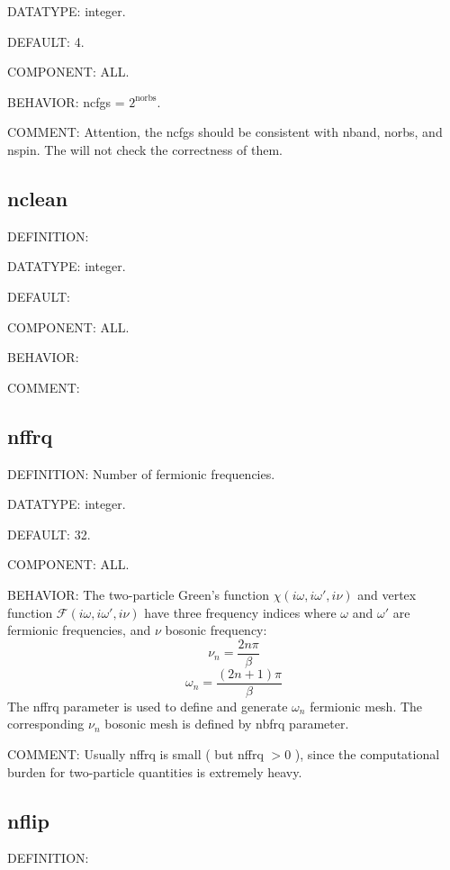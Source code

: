 {\color{green}DATATYPE:} integer.

{\color{blue}DEFAULT:} 4.

{\color{brown}COMPONENT:} ALL.

{\color{purple}BEHAVIOR:} ncfgs = $2^{\text{norbs}}$.

{\color{olive}COMMENT:} Attention, the ncfgs should be consistent with nband, norbs, and nspin. The {\iqist} will not check the 
correctness of them.

\subsection{nclean}
{\color{red}DEFINITION:}

{\color{green}DATATYPE:} integer.

{\color{blue}DEFAULT:}

{\color{brown}COMPONENT:} ALL.

{\color{purple}BEHAVIOR:}

{\color{olive}COMMENT:}

\subsection{nffrq}
{\color{red}DEFINITION:} Number of fermionic frequencies.

{\color{green}DATATYPE:} integer.

{\color{blue}DEFAULT:} 32.

{\color{brown}COMPONENT:} ALL.

{\color{purple}BEHAVIOR:} The two-particle Green's function $\chi(i\omega,i\omega',i\nu)$ and vertex function $\mathcal{F}(i\omega,i\omega',i\nu)$ have three frequency indices where $\omega$ and $\omega'$ are fermionic frequencies, and $\nu$ bosonic frequency:
\begin{equation}
\nu_n = \frac{2n\pi}{\beta}
\end{equation}
\begin{equation}
\omega_n = \frac{(2n + 1)\pi}{\beta}
\end{equation}
The nffrq parameter is used to define and generate $\omega_n$ fermionic mesh. The corresponding $\nu_n$ bosonic mesh is defined by nbfrq parameter.

{\color{olive}COMMENT:} Usually nffrq is small ( but nffrq $> 0$ ), since the computational burden for two-particle quantities is extremely heavy.

\subsection{nflip}
{\color{red}DEFINITION:}


